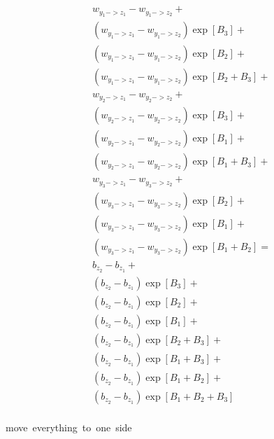 \documentclass{article}
\begin{document}
\begin{multline}\\
    w_{y_1->z_1} - w_{y_1->z_2} +\\
    (w_{y_1->z_1} - w_{y_1->z_2})\exp[B_3] + \\
    (w_{y_1->z_1} - w_{y_1->z_2})\exp[B_2] + \\
    (w_{y_1->z_1} - w_{y_1->z_2})\exp[B_2+B_3]  +\\ 
    w_{y_2->z_1} - w_{y_2->z_2} + \\
    (w_{y_2->z_1} - w_{y_2->z_2})\exp[B_3] +\\
    (w_{y_2->z_1} - w_{y_2->z_2})\exp[B_1] +\\
    (w_{y_2->z_1} - w_{y_2->z_2})\exp[B_1+B_3] +\\
    w_{y_3->z_1} - w_{y_3->z_2} +\\
    (w_{y_3->z_1} - w_{y_3->z_2})\exp[B_2] +\\
    (w_{y_3->z_1} - w_{y_3->z_2})\exp[B_1] +\\
    (w_{y_3->z_1} - w_{y_3->z_2})\exp[B_1+B_2] =\\
    b_{z_2} - b_{z_1} +\\
    (b_{z_2} - b_{z_1})\exp[B_3] +\\
    (b_{z_2} - b_{z_1})\exp[B_2] +\\
    (b_{z_2} - b_{z_1})\exp[B_1] +\\
    (b_{z_2} - b_{z_1})\exp[B_2+B_3] +\\
    (b_{z_2} - b_{z_1})\exp[B_1+B_3] +\\
    (b_{z_2} - b_{z_1})\exp[B_1+B_2] +\\
    (b_{z_2} - b_{z_1})\exp[B_1+B_2+B_3]\\
\end{multline}

\hbox{move everything to one side}
\end{document}
